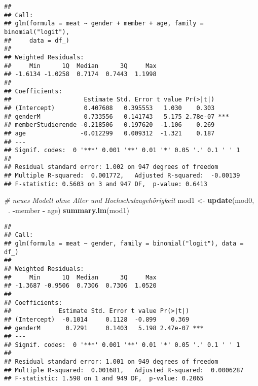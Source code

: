 \documentclass[]{article}
\newenvironment{Shaded}{\begin{snugshade}}{\end{snugshade}}
\newcommand{\KeywordTok}[1]{\textcolor[rgb]{0.13,0.29,0.53}{\textbf{#1}}}
\newcommand{\DecValTok}[1]{\textcolor[rgb]{0.00,0.00,0.81}{#1}}
\newcommand{\StringTok}[1]{\textcolor[rgb]{0.31,0.60,0.02}{#1}}
\newcommand{\CommentTok}[1]{\textcolor[rgb]{0.56,0.35,0.01}{\textit{#1}}}
\newcommand{\OperatorTok}[1]{\textcolor[rgb]{0.81,0.36,0.00}{\textbf{#1}}}
\newcommand{\NormalTok}[1]{#1}
\begin{document}
\begin{verbatim}
## 
## Call:
## glm(formula = meat ~ gender + member + age, family = binomial("logit"), 
##     data = df_)
## 
## Weighted Residuals:
##     Min      1Q  Median      3Q     Max 
## -1.6134 -1.0258  0.7174  0.7443  1.1998 
## 
## Coefficients:
##                    Estimate Std. Error t value Pr(>|t|)    
## (Intercept)        0.407608   0.395553   1.030    0.303    
## genderM            0.733556   0.141743   5.175 2.78e-07 ***
## memberStudierende -0.218506   0.197620  -1.106    0.269    
## age               -0.012299   0.009312  -1.321    0.187    
## ---
## Signif. codes:  0 '***' 0.001 '**' 0.01 '*' 0.05 '.' 0.1 ' ' 1
## 
## Residual standard error: 1.002 on 947 degrees of freedom
## Multiple R-squared:  0.001772,   Adjusted R-squared:  -0.00139 
## F-statistic: 0.5603 on 3 and 947 DF,  p-value: 0.6413
\end{verbatim}

\begin{Shaded}
\begin{Highlighting}[]
\CommentTok{# neues Modell ohne Alter und Hochschulzugehörigkeit}
\NormalTok{mod1 <-}\StringTok{ }\KeywordTok{update}\NormalTok{(mod0, }\OperatorTok{~}\NormalTok{. }\OperatorTok{-}\NormalTok{member }\OperatorTok{-}\StringTok{ }\NormalTok{age)}
\KeywordTok{summary.lm}\NormalTok{(mod1)}
\end{Highlighting}
\end{Shaded}

\begin{verbatim}
## 
## Call:
## glm(formula = meat ~ gender, family = binomial("logit"), data = df_)
## 
## Weighted Residuals:
##     Min      1Q  Median      3Q     Max 
## -1.3687 -0.9506  0.7306  0.7306  1.0520 
## 
## Coefficients:
##             Estimate Std. Error t value Pr(>|t|)    
## (Intercept)  -0.1014     0.1128  -0.899    0.369    
## genderM       0.7291     0.1403   5.198 2.47e-07 ***
## ---
## Signif. codes:  0 '***' 0.001 '**' 0.01 '*' 0.05 '.' 0.1 ' ' 1
## 
## Residual standard error: 1.001 on 949 degrees of freedom
## Multiple R-squared:  0.001681,   Adjusted R-squared:  0.0006287 
## F-statistic: 1.598 on 1 and 949 DF,  p-value: 0.2065
\end{verbatim}

\begin{Shaded}
\end{Shaded}
\end{document}
